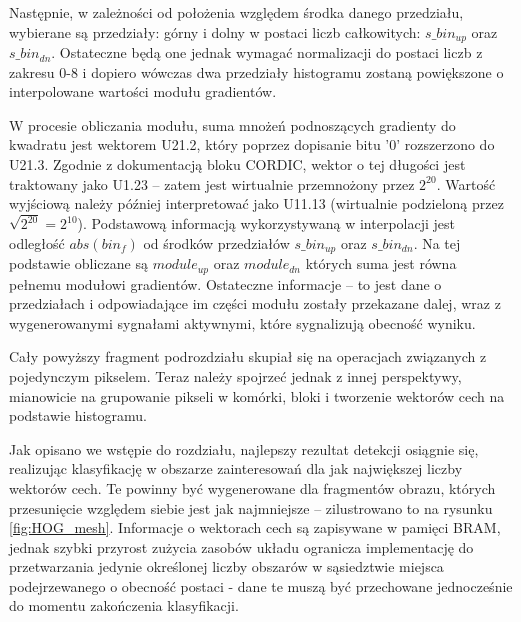 Następnie, w zależności od położenia względem środka danego przedziału, wybierane są przedziały: górny i dolny w postaci liczb całkowitych: $s\_bin_{up}$ oraz $s\_bin_{dn}$. 
Ostateczne będą one jednak wymagać normalizacji do postaci liczb z zakresu 0-8 i dopiero wówczas
dwa przedziały histogramu zostaną powiększone o interpolowane wartości modułu gradientów. %

W procesie obliczania modułu, suma mnożeń podnoszących gradienty do kwadratu jest wektorem U21.2, który poprzez dopisanie bitu '0' rozszerzono do U21.3. 
Zgodnie z dokumentacją bloku CORDIC, wektor o tej długości jest traktowany jako U1.23 -- zatem jest wirtualnie przemnożony przez $2^{20}$. 
Wartość wyjściową należy później interpretować jako U11.13 (wirtualnie podzieloną przez $\sqrt{2^{20}}=2^{10}$). 
Podstawową informacją wykorzystywaną w interpolacji jest odległość $abs(bin_f)$ od środków przedziałów $s\_bin_{up}$ oraz $s\_bin_{dn}$. 
Na tej podstawie obliczane są $module_{up}$ oraz $module_{dn}$ których suma jest równa pełnemu modułowi gradientów.
Ostateczne informacje -- to jest dane o przedziałach i odpowiadające im części modułu zostały przekazane dalej, wraz z wygenerowanymi sygnałami aktywnymi, które sygnalizują obecność wyniku. %

Cały powyższy fragment podrozdziału skupiał się na operacjach związanych z pojedynczym pikselem. 
Teraz należy spojrzeć jednak z innej perspektywy, mianowicie na grupowanie pikseli w komórki, bloki i tworzenie wektorów cech na podstawie histogramu. 

Jak opisano we wstępie do rozdziału, najlepszy rezultat detekcji osiągnie się, realizując klasyfikację w obszarze zainteresowań dla jak największej liczby wektorów cech. Te powinny być wygenerowane dla fragmentów obrazu, których przesunięcie względem siebie jest jak najmniejsze -- zilustrowano to na rysunku \ref{fig:HOG_mesh}. %
Informacje o wektorach cech są zapisywane w pamięci BRAM, %
jednak szybki przyrost zużycia zasobów układu ogranicza implementację do przetwarzania jedynie określonej liczby obszarów w sąsiedztwie miejsca podejrzewanego o obecność postaci - dane te muszą być przechowane jednocześnie do momentu zakończenia klasyfikacji. %

